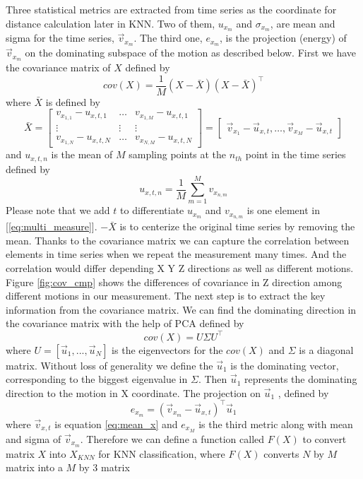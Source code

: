 \documentclass[acmtog]{acmart}
\begin{document}
Three statistical metrics are extracted from time series as the coordinate for distance calculation later in KNN. Two of them, $u_{x_m} $ and $\sigma_{x_m}$, are mean and sigma for the time series, $\vec{v}_{x_m}$. The third one,  $e_{x_m}$, is the projection (energy) of  $\vec{v}_{x_m}$ on the dominating subspace of the motion  as described below.
First we have the covariance matrix of $X$ \cite{cov_m} defined by 
\begin{equation}
cov(X)=\frac{1}{M} (X-\bar{X})(X-\bar{X})^\top
\label{eq:cov_x}
\end{equation}
where $\bar{X}$ is defined by 
\begin{equation}
\bar{X}=
\begin{bmatrix}
v_{x_{1,1}}-u_{x,t,1} & \dots & v_{x_{1,M}}-u_{x,t,1} \\
 \vdots & \vdots & \vdots \\
v_{x_{1,N}}-u_{x,t,N} & \dots & v_{x_{N,M}}-u_{x,t,N}
\end{bmatrix}
=
\begin{bmatrix}
\vec{v}_{x_1}-\vec{u}_{x,t} ,\dots, \vec{v}_{x_M}-\vec{u}_{x,t}
\end{bmatrix}
\label{eq:mean_x}
\end{equation}
and $u_{x,t,n}$ is the mean of $M$ sampling points at the $n_{th}$ point in the time series defined by
\begin{equation}
u_{x,t,n}=\frac{1}{M}  \sum_{m=1}^{M} v_{x_{n,m}}
\label{eq:cov_x}
\end{equation}
Please note that we add $t$ to differentiate $u_{x_m}$ and $v_{x_{n,m}}$ is one element in [\ref{eq:multi_measure}].
$-\bar{X}$  is to centerize the original time series by  removing the mean. Thanks to the covariance matrix we can capture the correlation between elements in time series when we repeat the measurement many times. And the correlation would differ depending X Y Z directions as well as different motions. Figure \ref{fig:cov_cmp} shows the differences of covariance in Z direction among different motions in our measurement. The next step is  to extract the key information from the covariance matrix. We can find the dominating direction in the covariance matrix  with the help of PCA defined by
\begin{equation}
cov(X)=U \Sigma U^\top
\label{eq:pca}
\end{equation}
where $U=[\vec{u}_1, ...,\vec{u}_N]$  is the eigenvectors for the $cov(X)$ and $\Sigma$ is a diagonal matrix. Without loss of generality we define the $\vec{u}_1$ is the dominating vector, corresponding to the biggest eigenvalue  in $\Sigma$. Then $\vec{u}_1$ represents the dominating direction  to the motion in X coordinate.  The projection on $\vec{u}_1$ , defined by 
\begin{equation}
e_{x_m}=(\vec{v}_{x_m}-\vec{u}_{x,t})^\top \vec{u}_1
 \label{eq:e_on_M}
\end{equation}
where $\vec{v}_{x,t}$ is equation  \ref{eq:mean_x} and $e_{x_M}$ is the third metric along with mean and sigma of $\vec{v}_{x_m}$. Therefore we can define a function called $F(X)$ to convert matrix $X$ into $X_{KNN}$ for KNN classification, where $F(X)$ converts $N$ by $M$ matrix into a $M$ by $3$ matrix
\end{document}
